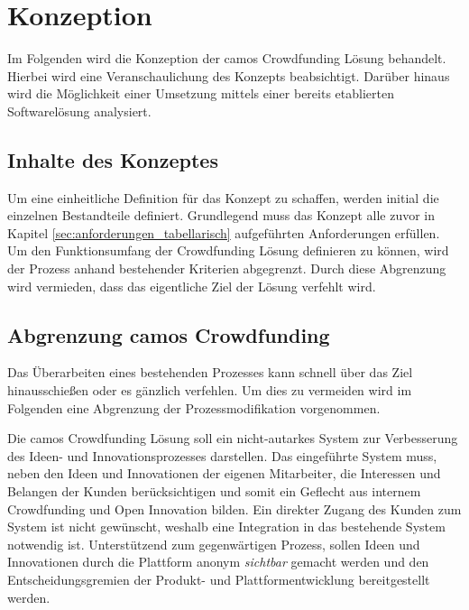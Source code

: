 \newcommand{\mc}[2]{\multicolumn{#1}{c}{#2}}

\chapter{Konzeption}\label{sec:concept}
Im Folgenden wird die Konzeption der camos Crowdfunding Lösung behandelt. Hierbei wird eine Veranschaulichung des Konzepts beabsichtigt. Darüber hinaus wird die Möglichkeit einer Umsetzung mittels einer bereits etablierten Softwarelösung analysiert.

\section{Inhalte des Konzeptes}
Um eine einheitliche Definition für das Konzept zu schaffen, werden initial die einzelnen Bestandteile definiert. Grundlegend muss das Konzept alle zuvor in Kapitel \ref{sec:anforderungen_tabellarisch} aufgeführten Anforderungen erfüllen. Um den Funktionsumfang der Crowdfunding Lösung definieren zu können, wird der Prozess anhand bestehender Kriterien abgegrenzt. Durch diese Abgrenzung wird vermieden, dass das eigentliche Ziel der Lösung verfehlt wird.

\section{Abgrenzung camos Crowdfunding}
Das Überarbeiten eines bestehenden Prozesses kann schnell über das Ziel hinausschießen oder es gänzlich verfehlen. Um dies zu vermeiden wird im Folgenden eine Abgrenzung der Prozessmodifikation vorgenommen.

Die camos Crowdfunding Lösung soll ein nicht-autarkes System zur Verbesserung des Ideen- und Innovationsprozesses darstellen. Das eingeführte System muss, neben den Ideen und Innovationen der eigenen Mitarbeiter, die Interessen und Belangen der Kunden berücksichtigen und somit ein Geflecht aus internem Crowdfunding und Open Innovation bilden. Ein direkter Zugang des Kunden zum System ist nicht gewünscht, weshalb eine Integration in das bestehende System notwendig ist. Unterstützend zum gegenwärtigen Prozess, sollen Ideen und Innovationen durch die Plattform anonym \emph{sichtbar} gemacht werden und den Entscheidungsgremien der Produkt- und Plattformentwicklung bereitgestellt werden.

